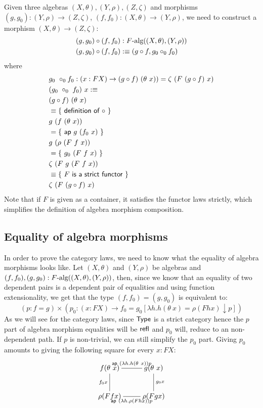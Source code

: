 \documentclass[a4paper,10pt]{report}
\begin{document}
Given three algebras $(X,\theta), (Y,\rho), (Z,\zeta)$ and morphisms
$(g,g_0) : (Y,\rho) \to (Z,\zeta)$,
$(f,f_0) : (X,\theta) \to (Y,\rho)$, we need to construct a morphism
$(X,\theta) \to (Z,\zeta)$:
%
\begin{align*}
  &(g,g_0) \circ (f,f_0) : F\mbox{-alg}((X,\theta),(Y,\rho)) \\
  &(g,g_0) \circ (f,f_0) :\equiv (g \circ f , g_0 \circ_0 f_0)
\end{align*}
%
where
%
\begin{align*}
  &g_0\ \circ_0 f_0 : (x : FX) \to (g \circ f)\ (\theta\ x)) = \zeta\ (F\ (g \circ f)\ x) \\
  &(g_0\ \circ_0\ f_0)\ x :\equiv \\
  &(g \circ f)\ (\theta\ x) \\
  &\equiv \{\ \textsf{definition of $\circ$}\ \} \\
  &g\ (f\ (\theta\ x)) \\
  &= \{\ \mathsf{ap}\ g\ (f_0\ x)\ \} \\
  &g\ (\rho\ (F\ f\ x)) \\
  &= \{\ g_0\ (F\ f\ x)\ \} \\
  &\zeta\ (F\ g\ (F\ f\ x)) \\
  &\equiv \{\ \textsf{$F$ is a strict functor}\ \} \\
  &\zeta\ (F\ (g \circ f)\ x)
\end{align*}
%
Note that if $F$ is given as a container, it satisfies the functor
laws strictly, which simplifies the definition of algebra morphism
composition.

\subsection{Equality of algebra morphisms}

In order to prove the category laws, we need to know what the equality
of algebra morphisms looks like. Let $(X,\theta)$ and $(Y, \rho)$ be
algebras and $(f,f_0) ,(g, g_0) : F\mbox{-alg}((X,\theta),(Y,\rho))$,
then, since we know that an equality of two dependent pairs is a
dependent pair of equalities and using function extensionality, we
get that the type $(f,f_0) = (g,g_0)$ is equivalent to:
$$
(p : f = g) \times (p_0 : (x : FX) \to f_0 = g_0 [ \lambda h . h (\theta\ x) = \rho (F h x) \downarrow p ])
$$
As we will see for the category laws, since $\mathsf{Type}$ is a strict
category hence the $p$ part of algebra morphism equalities will be
$\operatorname{\mathsf{refl}}$ and $p_0$ will, reduce to an non-dependent path. If $p$ is
non-trivial, we can still simplify the $p_0$ part. Giving $p_0$
amounts to giving the following square for every $x : FX$:
$$
\xymatrix{
f (\theta\ x) \ar@{-}[d]_{f_0 x} \ar@{-}[r]^{\ap\ (\lambda h . h (\theta\ x)) p}  &g (\theta\ x) \ar@{-}[d]^{g_0 x} \\
\rho (F f x) \ar@{-}[r]_{\ap\ (\lambda h . \rho (F h x)) p} &\rho (F g x) }
$$
\end{document}

